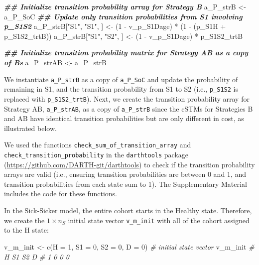 \documentclass[
]{article}
\newenvironment{Shaded}{\begin{snugshade}}{\end{snugshade}}
\newcommand{\AttributeTok}[1]{\textcolor[rgb]{0.77,0.63,0.00}{#1}}
\newcommand{\CommentTok}[1]{\textcolor[rgb]{0.56,0.35,0.01}{\textit{#1}}}
\newcommand{\DecValTok}[1]{\textcolor[rgb]{0.00,0.00,0.81}{#1}}
\newcommand{\DocumentationTok}[1]{\textcolor[rgb]{0.56,0.35,0.01}{\textbf{\textit{#1}}}}
\newcommand{\FunctionTok}[1]{\textcolor[rgb]{0.00,0.00,0.00}{#1}}
\newcommand{\NormalTok}[1]{#1}
\newcommand{\OtherTok}[1]{\textcolor[rgb]{0.56,0.35,0.01}{#1}}
\newcommand{\SpecialCharTok}[1]{\textcolor[rgb]{0.00,0.00,0.00}{#1}}
\newcommand{\StringTok}[1]{\textcolor[rgb]{0.31,0.60,0.02}{#1}}
\begin{document}
\begin{Shaded}
\begin{Highlighting}[]
\DocumentationTok{\#\# Initialize transition probability array for Strategy B}
\NormalTok{a\_P\_strB }\OtherTok{\textless{}{-}}\NormalTok{ a\_P\_SoC}
\DocumentationTok{\#\# Update only transition probabilities from S1 involving p\_S1S2}
\NormalTok{a\_P\_strB[}\StringTok{"S1"}\NormalTok{, }\StringTok{"S1"}\NormalTok{, ] }\OtherTok{\textless{}{-}}\NormalTok{ (}\DecValTok{1} \SpecialCharTok{{-}}\NormalTok{ v\_p\_S1Dage) }\SpecialCharTok{*}\NormalTok{ (}\DecValTok{1} \SpecialCharTok{{-}}\NormalTok{ (p\_S1H }\SpecialCharTok{+}\NormalTok{ p\_S1S2\_trtB))}
\NormalTok{a\_P\_strB[}\StringTok{"S1"}\NormalTok{, }\StringTok{"S2"}\NormalTok{, ] }\OtherTok{\textless{}{-}}\NormalTok{ (}\DecValTok{1} \SpecialCharTok{{-}}\NormalTok{ v\_p\_S1Dage) }\SpecialCharTok{*}\NormalTok{ p\_S1S2\_trtB}

\DocumentationTok{\#\# Initialize transition probability matrix for Strategy AB as a copy of B\textquotesingle{}s}
\NormalTok{a\_P\_strAB }\OtherTok{\textless{}{-}}\NormalTok{ a\_P\_strB}
\end{Highlighting}
\end{Shaded}

We instantiate \texttt{a\_P\_strB} as a copy of \texttt{a\_P\_SoC} and update the probability of remaining in S1, and the transition probability from S1 to S2 (i.e., \texttt{p\_S1S2} is replaced with \texttt{p\_S1S2\_trtB}). Next, we create the transition probability array for Strategy AB, \texttt{a\_P\_strAB}, as a copy of \texttt{a\_P\_strB} since the cSTMs for Strategies B and AB have identical transition probabilities but are only different in cost, as illustrated below.

We used the functions \texttt{check\_sum\_of\_transition\_array} and \texttt{check\_transition\_probability} in the \texttt{darthtools} package (\url{https://github.com/DARTH-git/darthtools}) to check if the transition probability arrays are valid (i.e., ensuring transition probabilities are between 0 and 1, and transition probabilities from each state sum to 1). The Supplementary Material includes the code for these functions.

In the Sick-Sicker model, the entire cohort starts in the Healthy state. Therefore, we create the \(1 \times n_S\) initial state vector \texttt{v\_m\_init} with all of the cohort assigned to the H state:

\begin{Shaded}
\begin{Highlighting}[]
\NormalTok{v\_m\_init }\OtherTok{\textless{}{-}} \FunctionTok{c}\NormalTok{(}\AttributeTok{H =} \DecValTok{1}\NormalTok{, }\AttributeTok{S1 =} \DecValTok{0}\NormalTok{, }\AttributeTok{S2 =} \DecValTok{0}\NormalTok{, }\AttributeTok{D =} \DecValTok{0}\NormalTok{) }\CommentTok{\# initial state vector}
\NormalTok{v\_m\_init}
\CommentTok{\#  H S1 S2  D }
\CommentTok{\#  1  0  0  0}
\end{Highlighting}
\end{Shaded}
\end{document}
